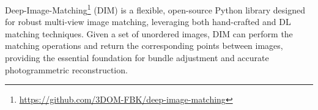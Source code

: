 
Deep-Image-Matching\footnote{\url{https://github.com/3DOM-FBK/deep-image-matching}} (DIM) is a flexible, open-source Python library designed for robust multi-view image matching, leveraging both hand-crafted and DL matching techniques.  
Given a set of unordered images, DIM can perform the matching operations and return the corresponding points between images, providing the essential foundation for bundle adjustment and accurate photogrammetric reconstruction.

